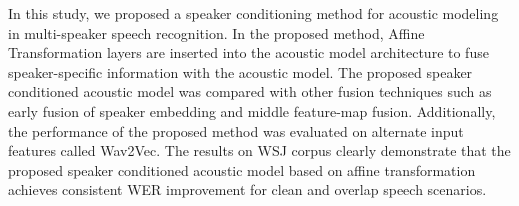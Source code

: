 \documentclass{article}
\begin{document}
In this study, we proposed a speaker conditioning method for acoustic modeling in multi-speaker speech recognition. In the proposed method, Affine Transformation layers are inserted into the acoustic model architecture to fuse speaker-specific information with the acoustic model. The proposed speaker conditioned acoustic model  was compared with  other fusion techniques such as early fusion of speaker embedding and middle feature-map fusion. Additionally, the performance of the proposed method was evaluated on alternate input features called Wav2Vec. The results on WSJ corpus clearly demonstrate that the proposed speaker conditioned acoustic model based on affine transformation achieves consistent WER improvement for clean and overlap speech scenarios. 








% 


%

\end{document}
